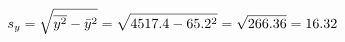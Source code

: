 \documentclass[preview]{standalone}
\begin{document}
\begin{align*}
\special{dvisvgm:raw <g id='unique000'>}s_y = \sqrt{\overline{y^2} - \bar{y}^2} = \sqrt{4517.4 - 65.2^2} = \sqrt{266.36} = 16.32\special{dvisvgm:raw </g>}
\end{align*}
\end{document}
